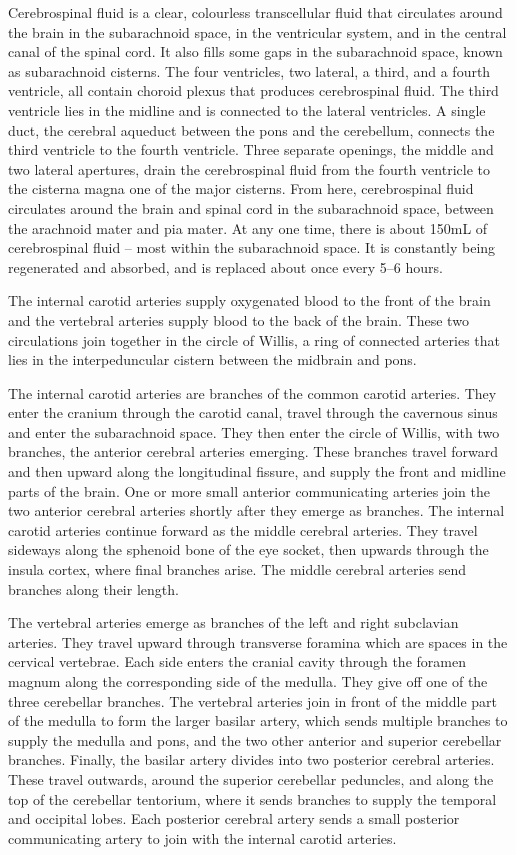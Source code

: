 Cerebrospinal fluid is a clear, colourless transcellular fluid that circulates around the brain in the subarachnoid space, in the ventricular system, and in the central canal of the spinal cord. It also fills some gaps in the subarachnoid space, known as subarachnoid cisterns. The four ventricles, two lateral, a third, and a fourth ventricle, all contain choroid plexus that produces cerebrospinal fluid. The third ventricle lies in the midline and is connected to the lateral ventricles. A single duct, the cerebral aqueduct between the pons and the cerebellum, connects the third ventricle to the fourth ventricle. Three separate openings, the middle and two lateral apertures, drain the cerebrospinal fluid from the fourth ventricle to the cisterna magna one of the major cisterns. From here, cerebrospinal fluid circulates around the brain and spinal cord in the subarachnoid space, between the arachnoid mater and pia mater. At any one time, there is about 150mL of cerebrospinal fluid -- most within the subarachnoid space. It is constantly being regenerated and absorbed, and is replaced about once every 5--6 hours.

The internal carotid arteries supply oxygenated blood to the front of the brain and the vertebral arteries supply blood to the back of the brain. These two circulations join together in the circle of Willis, a ring of connected arteries that lies in the interpeduncular cistern between the midbrain and pons.

The internal carotid arteries are branches of the common carotid arteries. They enter the cranium through the carotid canal, travel through the cavernous sinus and enter the subarachnoid space. They then enter the circle of Willis, with two branches, the anterior cerebral arteries emerging. These branches travel forward and then upward along the longitudinal fissure, and supply the front and midline parts of the brain. One or more small anterior communicating arteries join the two anterior cerebral arteries shortly after they emerge as branches. The internal carotid arteries continue forward as the middle cerebral arteries. They travel sideways along the sphenoid bone of the eye socket, then upwards through the insula cortex, where final branches arise. The middle cerebral arteries send branches along their length.

The vertebral arteries emerge as branches of the left and right subclavian arteries. They travel upward through transverse foramina which are spaces in the cervical vertebrae. Each side enters the cranial cavity through the foramen magnum along the corresponding side of the medulla. They give off one of the three cerebellar branches. The vertebral arteries join in front of the middle part of the medulla to form the larger basilar artery, which sends multiple branches to supply the medulla and pons, and the two other anterior and superior cerebellar branches. Finally, the basilar artery divides into two posterior cerebral arteries. These travel outwards, around the superior cerebellar peduncles, and along the top of the cerebellar tentorium, where it sends branches to supply the temporal and occipital lobes. Each posterior cerebral artery sends a small posterior communicating artery to join with the internal carotid arteries.

